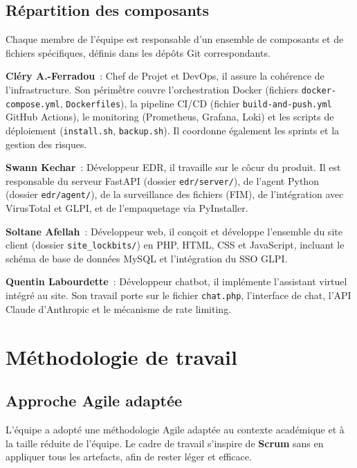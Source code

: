 \subsection{R\'epartition des composants}

Chaque membre de l'\'equipe est responsable d'un ensemble de composants
et de fichiers sp\'ecifiques, d\'efinis dans les d\'ep\^ots Git
correspondants.

\textbf{Cl\'ery A.-Ferradou}~: Chef de Projet et DevOps, il assure la
coh\'erence de l'infrastructure. Son p\'erim\`être couvre
l'orchestration Docker (fichiers \texttt{docker-compose.yml},
\texttt{Dockerfiles}), la pipeline CI/CD (fichier
\texttt{build-and-push.yml} GitHub Actions), le monitoring
(Prometheus, Grafana, Loki) et les scripts de d\'eploiement
(\texttt{install.sh}, \texttt{backup.sh}). Il coordonne \'egalement
les sprints et la gestion des risques.

\textbf{Swann Kechar}~: D\'eveloppeur EDR, il travaille sur le c\^ocur
du produit. Il est responsable du serveur FastAPI (dossier
\texttt{edr/server/}), de l'agent Python (dossier \texttt{edr/agent/}),
de la surveillance des fichiers (FIM), de l'int\'egration avec
VirusTotal et GLPI, et de l'empaquetage via PyInstaller.

\textbf{Soltane Afellah}~: D\'eveloppeur web, il con\c{c}oit et
d\'eveloppe l'ensemble du site client (dossier
\texttt{site\_lockbits/}) en PHP, HTML, CSS et JavaScript, incluant le
sch\'ema de base de donn\'ees MySQL et l'int\'egration du SSO GLPI.

\textbf{Quentin Labourdette}~: D\'eveloppeur chatbot, il impl\'emente
l'assistant virtuel int\'egr\'e au site. Son travail porte sur le
fichier \texttt{chat.php}, l'interface de chat, l'API Claude
d'Anthropic et le m\'ecanisme de rate limiting.

\section{M\'ethodologie de travail}

\subsection{Approche Agile adapt\'ee}

L'\'equipe a adopt\'e une m\'ethodologie Agile adapt\'ee au contexte
acad\'emique et \`a la taille r\'eduite de l'\'equipe. Le cadre de
travail s'inspire de \textbf{Scrum} sans en appliquer tous les
artefacts, afin de rester l\'eger et efficace.

